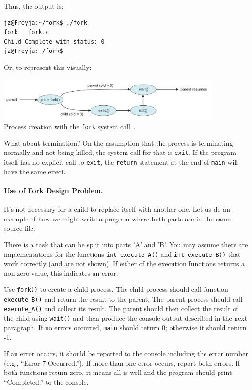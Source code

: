 Thus, the output is:
\begin{verbatim}
jz@Freyja:~/fork$ ./fork 
fork   fork.c
Child Complete with status: 0
jz@Freyja:~/fork$ 
\end{verbatim}

Or, to represent this visually:

\begin{center}
	\includegraphics[width=0.85\textwidth]{images/fork-syscall.png}\\
	Process creation with the \texttt{fork} system call~\cite{osc}.
\end{center}

What about termination? On the assumption that the process is terminating normally and not being killed, the system call for that is \texttt{exit}. If the program itself has no explicit call to \texttt{exit}, the \texttt{return} statement at the end of \texttt{main} will have the same effect.

\paragraph{Use of Fork Design Problem. }
It's not necessary for a child to replace itself with another one. Let us do an example of how we might write a program where both parts are in the same source file.

There is a task that can be split into parts 'A' and 'B'. You may assume there are implementations for the functions \texttt{int execute\_A()} and \texttt{int execute\_B()} that work correctly (and are not shown). If either of the execution functions returns a non-zero value, this indicates an error.

Use \texttt{fork()} to create a child process. The child process should call function \texttt{execute\_B()} and return the result to the parent. The parent process should call \texttt{execute\_A()} and collect its result. The parent should then collect the result of the child using \texttt{wait()} and then produce the console output described in the next paragraph. If no errors occurred, \texttt{main} should return 0; otherwise it should return -1.

If an error occurs, it should be reported to the console including the error number (e.g., ``Error 7 Occurred.''). If more than one error occurs, report both errors. If both functions return zero, it means all is well and the program should print ``Completed.'' to the console.

